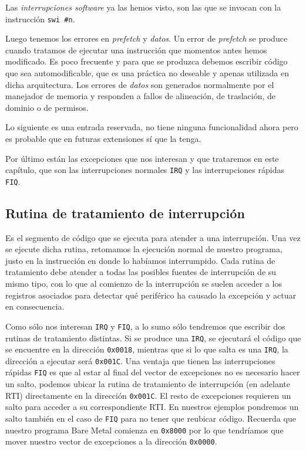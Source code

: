 Las {\it interrupciones software} ya las hemos visto, son las que se invocan con la
instrucción {\tt swi \#n}.

Luego tenemos los errores en {\it prefetch} y {\it datos}. Un error de {\it prefetch} se produce
cuando tratamos de ejecutar una instrucción que momentos antes hemos modificado. Es poco
frecuente y para que se produzca debemos escribir código que sea automodificable, que es
una práctica no deseable y apenas utilizada en dicha arquitectura. Los errores de {\it datos}
son generados normalmente por el manejador de memoria y responden a fallos de alineación, de
traslación, de dominio o de permisos.

Lo siguiente es una entrada reservada, no tiene ninguna funcionalidad ahora
pero es probable que en futuras extensiones sí que la tenga.

Por último están las excepciones que nos interesan y que trataremos en este capítulo, que son
las interrupciones normales {\tt IRQ} y las interrupciones rápidas {\tt FIQ}.

\subsection{Rutina de tratamiento de interrupción}

Es el segmento de código que se ejecuta para atender a una interrupción. Una vez se ejecute
dicha rutina, retomamos la ejecución normal de nuestro programa, justo en la instrucción en
donde lo habíamos interrumpido. Cada rutina de tratamiento debe atender a todas las posibles
fuentes de interrupción de su mismo tipo, con lo que al comienzo de la interrupción se suelen
acceder a los registros asociados para detectar qué periférico ha causado la excepción y
actuar en consecuencia.

Como sólo nos interesan {\tt IRQ} y {\tt FIQ}, a lo sumo sólo tendremos que escribir dos
rutinas de tratamiento distintas. Si se produce una {\tt IRQ}, se ejecutará el código
que se encuentre en la dirección {\tt 0x0018}, mientras que si lo que salta es una {\tt IRQ},
la dirección a ejecutar será {\tt 0x001C}. Una ventaja que tienen las interrupciones rápidas
{\tt FIQ} es que al estar al final del vector de excepciones no es necesario hacer un salto,
podemos ubicar la rutina de tratamiento de interrupción (en adelante RTI) directamente en
la dirección {\tt 0x001C}. El resto de excepciones requieren un salto para acceder a su
correspondiente RTI. En nuestros ejemplos pondremos un salto también en el caso de {\tt FIQ}
para no tener que reubicar código. Recuerda que nuestro programa Bare Metal comienza en
{\tt 0x8000} por lo que tendríamos que mover nuestro vector de excepciones a la dirección
{\tt 0x0000}.

